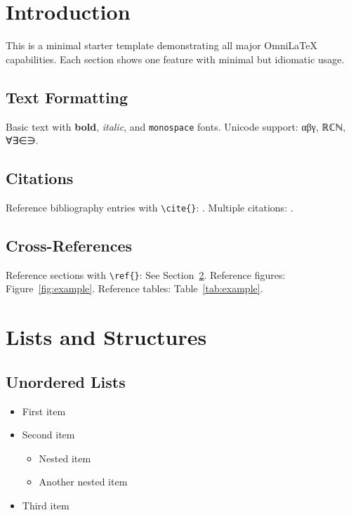 \documentclass[
    language=english,
    institution=none,        %
    oneside,                 %
    loadGlossaries,          %
]{../../omnilatex}
\begin{document}
\maketitle

\tableofcontents

\chapter{Introduction}

This is a minimal starter template demonstrating all major OmniLaTeX capabilities.
Each section shows one feature with minimal but idiomatic usage.

\section{Text Formatting}

Basic text with \textbf{bold}, \textit{italic}, and \texttt{monospace} fonts.
Unicode support: αβγ, ℝℂℕ, ∀∃∈∋.

\section{Citations}

Reference bibliography entries with \verb|\cite{}|: \cite{knuth1984texbook}.
Multiple citations: \cite{lamport1994latex,goossens1994latex}.

\section{Cross-References}

Reference sections with \verb|\ref{}|: See Section~\ref{sec:lists}.
Reference figures: Figure~\ref{fig:example}.
Reference tables: Table~\ref{tab:example}.

\chapter{Lists and Structures}
\label{sec:lists}

\section{Unordered Lists}

\begin{itemize}
    \item First item
    \item Second item
    \begin{itemize}
        \item Nested item
        \item Another nested item
    \end{itemize}
    \item Third item
\end{itemize}
\end{document}
